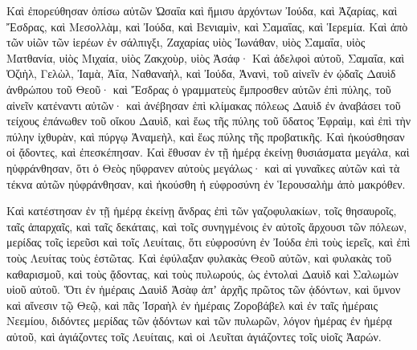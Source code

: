 {Καὶ ἐπορεύθησαν ὀπίσω αὐτῶν Ὠσαΐα καὶ ἥμισυ ἀρχόντων Ἰούδα,
καὶ Ἀζαρίας, καὶ Ἔσδρας, καὶ Μεσολλὰμ,
καὶ Ἰούδα, καὶ Βενιαμὶν, καὶ Σαμαΐας, καὶ Ἱερεμία.
Καὶ ἀπὸ τῶν υἱῶν τῶν ἱερέων ἐν σάλπιγξι, Ζαχαρίας υἱὸς Ἰωνάθαν, υἱὸς Σαμαΐα, υἱὸς Ματθανία, υἱὸς Μιχαία, υἱὸς Ζακχοὺρ, υἱὸς Ἀσάφ·
Καὶ ἀδελφοὶ αὐτοῦ, Σαμαΐα, καὶ Ὀζιὴλ, Γελὼλ, Ἰαμὰ, Ἀΐα, Ναθαναὴλ, καὶ Ἰούδα, Ἁνανὶ, τοῦ αἰνεῖν ἐν ᾠδαῖς Δαυὶδ ἀνθρώπου τοῦ Θεοῦ· καὶ Ἔσδρας ὁ γραμματεὺς ἔμπροσθεν αὐτῶν ἐπὶ πύλης,
τοῦ αἰνεῖν κατέναντι αὐτῶν· καὶ ἀνέβησαν ἐπὶ κλίμακας πόλεως Δαυὶδ ἐν ἀναβάσει τοῦ τείχους ἐπάνωθεν τοῦ οἴκου Δαυὶδ, καὶ ἕως τῆς πύλης τοῦ ὕδατος
Ἐφραὶμ, καὶ ἐπὶ τὴν πύλην ἰχθυρὰν, καὶ πύργῳ Ἁναμεὴλ, καὶ ἕως πύλης τῆς προβατικῆς.
Καὶ ἠκούσθησαν οἱ ᾄδοντες, καὶ ἐπεσκέπησαν.
Καὶ ἔθυσαν ἐν τῇ ἡμέρᾳ ἐκείνῃ θυσιάσματα μεγάλα, καὶ ηὐφράνθησαν, ὅτι ὁ Θεὸς ηὔφρανεν αὐτοὺς μεγάλως· καὶ αἱ γυναῖκες αὐτῶν καὶ τὰ τέκνα αὐτῶν ηὐφράνθησαν, καὶ ἠκούσθη ἡ εὐφροσύνη ἐν Ἱερουσαλὴμ ἀπὸ μακρόθεν.
\par }{\PP {}Καὶ κατέστησαν ἐν τῇ ἡμέρᾳ ἐκείνῃ ἄνδρας ἐπὶ τῶν γαζοφυλακίων, τοῖς θησαυροῖς, ταῖς ἀπαρχαῖς, καὶ ταῖς δεκάταις, καὶ τοῖς συνηγμένοις ἐν αὐτοῖς ἄρχουσι τῶν πόλεων, μερίδας τοῖς ἱερεῦσι καὶ τοῖς Λευίταις, ὅτι εὐφροσύνη ἐν Ἰούδα ἐπὶ τοὺς ἱερεῖς, καὶ ἐπὶ τοὺς Λευίτας τοὺς ἑστῶτας.
Καὶ ἐφύλαξαν φυλακὰς Θεοῦ αὐτῶν, καὶ φυλακὰς τοῦ καθαρισμοῦ, καὶ τοὺς ᾄδοντας, καὶ τοὺς πυλωρούς, ὡς ἐντολαὶ Δαυὶδ καὶ Σαλωμὼν υἱοῦ αὐτοῦ.
Ὅτι ἐν ἡμέραις Δαυὶδ Ἀσὰφ ἀπʼ ἀρχῆς πρῶτος τῶν ᾀδόντων, καὶ ὕμνον καὶ αἴνεσιν τῷ Θεῷ,
καὶ πᾶς Ἰσραὴλ ἐν ἡμέραις Ζοροβάβελ καὶ ἐν ταῖς ἡμέραις Νεεμίου, διδόντες μερίδας τῶν ᾀδόντων καὶ τῶν πυλωρῶν, λόγον ἡμέρας ἐν ἡμέρᾳ αὐτοῦ, καὶ ἁγιάζοντες τοῖς Λευίταις, καὶ οἱ Λευῖται ἁγιάζοντες τοῖς υἱοῖς Ἀαρών.

}
